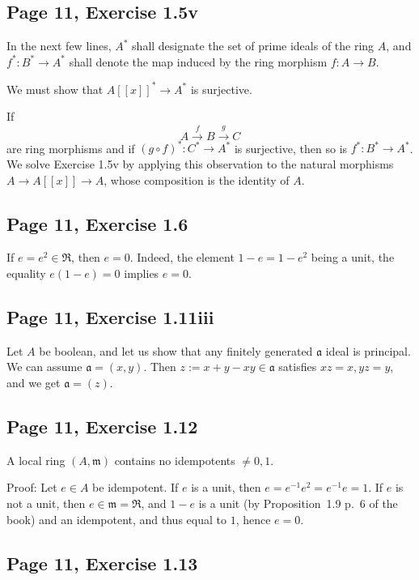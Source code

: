 \documentclass[parskip=half,fontsize=12pt]{scrartcl}%
\newcommand{\mf}{\mathfrak}
\newcommand{\aaa}{\mf a}
\newcommand{\mmm}{\mf m}
\begin{document}
\subsection{Page 11, Exercise 1.5v}%

In the next few lines, $A^*$ shall designate the set of prime ideals of the ring $A$, and $f^*:B^*\to A^*$ shall denote the map induced by the ring morphism $f:A\to B$. 

We must show that $A[[x]]^*\to A^*$ is surjective.

If 
$$
A\xrightarrow fB\xrightarrow gC
$$ 
are ring morphisms and if $(g\circ f)^*:C^*\to A^*$ is surjective, then so is $f^*:B^*\to A^*$. We solve Exercise 1.5v by applying this observation to the natural morphisms $A\to A[[x]]\to A$, whose composition is the identity of $A$. 

\subsection{Page 11, Exercise 1.6}%

If $e=e^2\in\mf R$, then $e=0$. Indeed, the element $1-e=1-e^2$ being a unit, the equality $e(1-e)=0$ implies $e=0$.

\subsection{Page 11, Exercise 1.11iii}%

Let $A$ be boolean, and let us show that any finitely generated $\aaa$ ideal is principal. We can assume $\aaa=(x,y)$. Then $z:=x+y-xy\in\aaa$ satisfies $xz=x,yz=y$, and we get $\aaa=(z)$.

\subsection{Page 11, Exercise 1.12}\label{112}%

A local ring $(A,\mmm)$ contains no idempotents $\neq0,1$. %

Proof: Let $e\in A$ be idempotent. If $e$ is a unit, then $e=e^{-1}e^2=e^{-1}e=1$. If $e$ is not a unit, then $e\in\mmm=\mf R$, and $1-e$ is a unit (by Proposition~1.9 p.~6 of the book) and an idempotent, and thus equal to $1$, hence $e=0$.

\subsection{Page 11, Exercise 1.13}%
\end{document}
